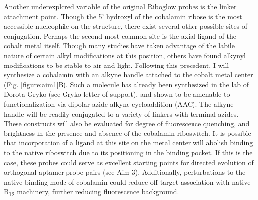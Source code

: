 Another underexplored variable of the original Riboglow probes is the linker attachment point.
Though the 5' hydroxyl of the cobalamin ribose is the most accessible nucleophile on the structure, there exist several other possible sites of conjugation.
Perhaps the second most common site is the axial ligand of the cobalt metal itself.
Though many studies have taken advantage of the labile nature of certain alkyl modifications at this position\cite{ShellVitaminB12Tunable2015}, others have found alkynyl modifications to be stable to air and light\cite{ChrominskiReductionfreesynthesisstable2013,RuetzMarkusPhenylethynylcobalaminLightStable2013}.
Following this precedent, I will synthesize a cobalamin with an alkyne handle attached to the cobalt metal center (Fig. \ref{figure:aim1}B).
Such a molecule has already been synthesized in the lab of Dorota Gryko (see Gryko letter of support), and shown to be amenable to functionalization via dipolar azide-alkyne cycloaddition (AAC)\cite{ChrominskiVitaminB12Derivatives2014}.
The alkyne handle will be readily conjugated to a variety of linkers with terminal azides\cite{KolbHartmuthC.ClickChemistryDiverse2001,PattersonFindingRightBioorthogonal2014}.
These constructs will also be evaluated for degree of fluorescence quenching, and brightness in the presence and absence of the cobalamin riboswitch.
It is possible that incorporation of a ligand at this site on the metal center will abolish binding to the native riboswitch due to its positioning in the binding pocket\cite{JohnsonJrB12cofactorsdirectly2012}.
If this is the case, these probes could serve as excellent starting points for directed evolution of orthogonal aptamer-probe pairs (see Aim 3). %
Additionally, perturbations to the native binding mode of cobalamin could reduce off-target association with native B\textsubscript{12} machinery\cite{PathareSynthesisCobalaminBiotin1996}, further reducing fluorescence background.

